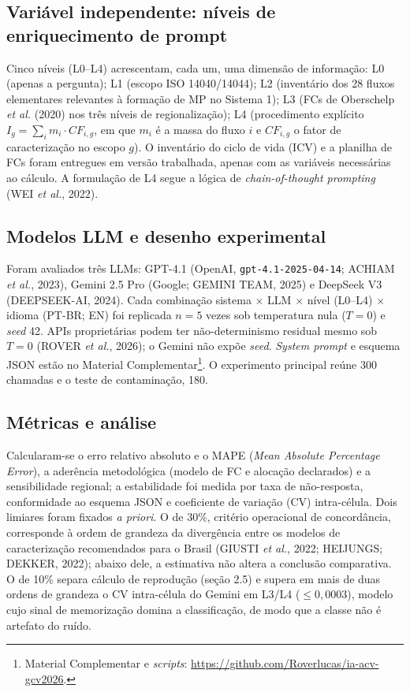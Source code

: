 \documentclass[12pt,a4paper]{article}
\begin{document}
\subsection{Variável independente: níveis de enriquecimento de prompt}

Cinco níveis (L0--L4) acrescentam, cada um, uma dimensão de informação: L0 (apenas a pergunta); L1 (escopo ISO 14040/14044); L2 (inventário dos 28 fluxos elementares relevantes à formação de MP no Sistema 1); L3 (FCs de Oberschelp \emph{et al.} (2020) nos três níveis de regionalização); L4 (procedimento explícito $I_g = \sum_i m_i \cdot CF_{i,g}$, em que $m_i$ é a massa do fluxo $i$ e $CF_{i,g}$ o fator de caracterização no escopo $g$). O inventário do ciclo de vida (ICV) e a planilha de FCs foram entregues em versão trabalhada, apenas com as variáveis necessárias ao cálculo. A formulação de L4 segue a lógica de \emph{chain-of-thought prompting} (WEI \emph{et al.}, 2022).

\subsection{Modelos LLM e desenho experimental}

Foram avaliados três LLMs: GPT-4.1 (OpenAI, \texttt{gpt-4.1-2025-04-14}; ACHIAM \emph{et al.}, 2023), Gemini 2.5 Pro (Google; GEMINI TEAM, 2025) e DeepSeek V3 (DEEPSEEK-AI, 2024). Cada combinação sistema $\times$ LLM $\times$ nível (L0--L4) $\times$ idioma (PT-BR; EN) foi replicada $n=5$ vezes sob temperatura nula ($T=0$) e \emph{seed} 42. APIs proprietárias podem ter não-determinismo residual mesmo sob $T=0$ (ROVER \emph{et al.}, 2026); o Gemini não expõe \emph{seed}. \emph{System prompt} e esquema JSON estão no Material Complementar\footnote{Material Complementar e \emph{scripts}: \url{https://github.com/Roverlucas/ia-acv-gcv2026}.}. O experimento principal reúne 300 chamadas e o teste de contaminação, 180.

\subsection{Métricas e análise}

Calcularam-se o erro relativo absoluto e o MAPE (\emph{Mean Absolute Percentage Error}), a aderência metodológica (modelo de FC e alocação declarados) e a sensibilidade regional; a estabilidade foi medida por taxa de não-resposta, conformidade ao esquema JSON e coeficiente de variação (CV) intra-célula. Dois limiares foram fixados \emph{a priori}. O de 30\%, critério operacional de concordância, corresponde à ordem de grandeza da divergência entre os modelos de caracterização recomendados para o Brasil (GIUSTI \emph{et al.}, 2022; HEIJUNGS; DEKKER, 2022); abaixo dele, a estimativa não altera a conclusão comparativa. O de 10\% separa cálculo de reprodução (seção 2.5) e supera em mais de duas ordens de grandeza o CV intra-célula do Gemini em L3/L4 ($\leq 0{,}0003$), modelo cujo sinal de memorização domina a classificação, de modo que a classe não é artefato do ruído.
\end{document}
